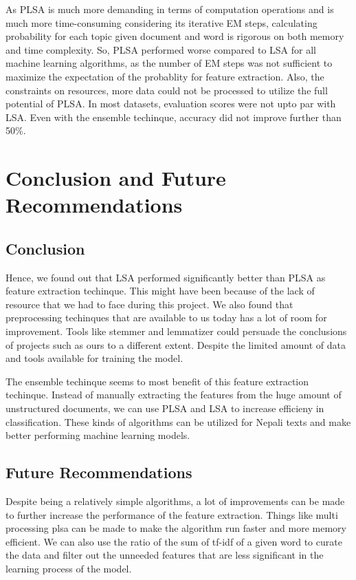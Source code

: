 \documentclass[12pt]{report}
\begin{document}
             As PLSA is much more demanding in terms of computation operations and is much more time-consuming considering its iterative EM steps, calculating probability for each topic given document and word
             is rigorous on both memory and time complexity. So, PLSA performed worse compared to LSA for all machine learning algorithms, as the number of EM steps was not sufficient to maximize the expectation of the probablity for feature extraction. 
             Also, the constraints on resources, more data could not be processed to utilize the full potential of PLSA. In most datasets, evaluation scores were not upto par with LSA.  
             Even with the ensemble techinque, accuracy did not improve further than 50\%. 



             \chapter{Conclusion and Future Recommendations}
             \section{Conclusion}
             Hence, we found out that LSA performed significantly better than PLSA as feature extraction techinque. This might have been because of the lack of resource that we had to face
             during this project. 
             We also found that preprocessing techinques that are available to us today has a lot of room for improvement. Tools like stemmer and lemmatizer could 
             persuade the conclusions of projects such as ours to a different extent. Despite the limited amount of data and tools available for training the model. 
             
             The ensemble techinque seems to most benefit of this feature extraction techinque. Instead of manually extracting the features from the huge amount of unstructured 
             documents, we can use PLSA and LSA to increase efficieny in classification. These kinds of algorithms can be utilized for Nepali texts 
             and make better performing machine learning models.

             \section{Future Recommendations}

             Despite being a relatively simple algorithms, a lot of improvements can be made to further increase the performance of the feature extraction.
             Things like multi processing plsa can be made to make the algorithm run faster and more memory efficient. 
             We can also use the ratio of the sum of tf-idf of a given word to curate the data and filter out the unneeded features that are less significant 
             in the learning process of the model. 
\end{document}
